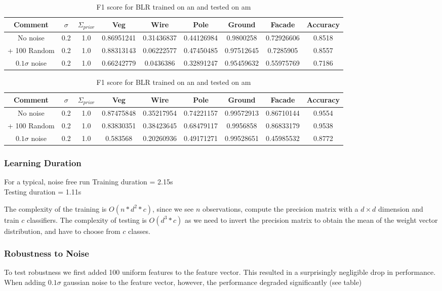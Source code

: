 \documentclass[10pt,a4paper]{article}
\begin{document}
\begin{table}[h]
\centering
\begin{tabular}{|c|c|c||c|c|c|c|c||c||}
\hline
Comment&$\sigma$&$\Sigma_{prior}$&Veg & Wire & Pole & Ground & Facade & Accuracy\\ \hline
No noise&0.2 & 1.0 & 0.86951241 & 0.31436837 & 0.44126984 & 0.9800258 &  0.72926606 & 0.8518\\ \hline
+ 100 Random & 0.2 & 1.0 & 0.88313143 & 0.06222577 & 0.47450485 & 0.97512645 & 0.7285905  & 0.8557\\ \hline
$0.1 \sigma$ noise & 0.2 & 1.0 & 0.66242779 & 0.0436386  & 0.32891247 & 0.95459632 & 0.55975769 & 0.7186 \\ \hline
\end{tabular}
\caption{F1 score for BLR trained on am and tested on an}
\vspace{10pt}
\begin{tabular}{||c|c|c||c|c|c|c|c||c||}
\hline
Comment&$\sigma$&$\Sigma_{prior}$&Veg & Wire & Pole & Ground & Facade & Accuracy\\ \hline
No noise & 0.2 & 1.0& 0.87475848 & 0.35217954  &0.74221157  &0.99572913  &0.86710144 & 0.9554\\ \hline
+ 100 Random & 0.2 & 1.0 & 0.83830351 & 0.38423645  &0.68479117  &0.9956858  &0.86833179 &0.9538 \\ \hline
$0.1 \sigma$ noise & 0.2 & 1.0 & 0.583568 & 0.20260936 & 0.49171271 & 0.99528651  &0.45985532 & 0.8772\\ \hline
\end{tabular}
\caption{F1 score for BLR trained on an and tested on am}
\label{BLR_tab}
\end{table}
\subsubsection{Learning Duration}
For a typical, noise free run
Training duration =  2.15s\\
Testing duration =  1.11s

The complexity of the training is $O(n*d^2*c)$, since we see $n$ observations, compute the precision matrix with a $d\times d$ dimension and train $c$ classifiers. The complexity of testing is $O(d^3*c)$ as we need to invert the precision matrix to obtain the mean of the weight vector distribution, and have to choose from $c$ classes.
\subsubsection{Robustness to Noise}
To test robustness we first added 100 uniform features to the feature vector. This resulted in a surprisingly negligible drop in performance.  When adding $0.1\sigma$ gaussian noise to the feature vector, however, the performance degraded significantly (see table)
\end{document}

